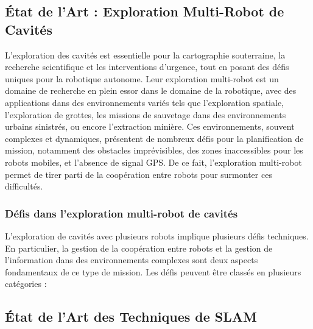 \documentclass[../main.tex]{subfiles}
\begin{document}
\subsection{État de l'Art : Exploration Multi-Robot de Cavités}

L'exploration des cavités est essentielle pour la cartographie souterraine, la recherche scientifique et les interventions d'urgence, tout en posant des défis uniques pour la robotique autonome.\cite{nationalgeographic_greenland_caves_2025}
Leur exploration multi-robot est un domaine de recherche en plein essor dans le domaine de la robotique, avec des applications dans des environnements variés tels que l'exploration spatiale, l'exploration de grottes, les missions de sauvetage dans des environnements urbains sinistrés, ou encore l'extraction minière.\cite{dang_2021,kambesis_2007} Ces environnements, souvent complexes et dynamiques, présentent de nombreux défis pour la planification de mission, notamment des obstacles imprévisibles, des zones inaccessibles pour les robots mobiles, et l'absence de signal GPS. De ce fait, l'exploration multi-robot permet de tirer parti de la coopération entre robots pour surmonter ces difficultés.

\subsubsection{Défis dans l'exploration multi-robot de cavités}

L'exploration de cavités avec plusieurs robots implique plusieurs défis techniques. En particulier, la gestion de la coopération entre robots et la gestion de l'information dans des environnements complexes sont deux aspects fondamentaux de ce type de mission. Les défis peuvent être classés en plusieurs catégories : 

\subsection{État de l'Art des Techniques de SLAM}
\end{document}
